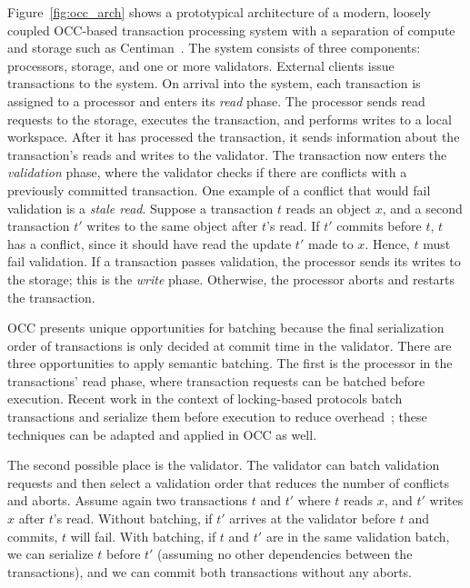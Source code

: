 Figure~\ref{fig:occ_arch} shows a prototypical architecture of a modern, loosely coupled OCC-based transaction processing system with a separation of compute and storage such as Centiman~\cite{ding2015centiman}. 
The system consists of three components: processors, storage, and one or more validators. External clients issue transactions to the system. On arrival into the system, each transaction is assigned to a processor and enters its \emph{read} phase. The processor sends read requests to the storage, executes the transaction, and performs writes to a local workspace. After it has processed the transaction, it sends information about the transaction's reads and writes to the validator. 
The transaction now enters the \emph{validation} phase, where 
the validator checks if there are conflicts with a previously committed transaction. 
One example of a conflict that would fail validation is a \emph{stale read}. Suppose a transaction $t$ reads an object $x$, and a second transaction
$t'$ writes to the same object after $t$'s read. If $t'$ commits before $t$, $t$
has a conflict, since it should have read the update $t'$ made to $x$. Hence, $t$ must fail validation. 
If a transaction passes validation, the processor sends its writes to the storage; this is the \emph{write} phase. Otherwise, the processor aborts and restarts the transaction.

OCC 
presents unique opportunities for batching because the final serialization order of transactions is only decided at commit time in the validator. 
There are three opportunities to apply semantic batching. The first is the processor in
the transactions' read phase, where transaction requests can be batched before
execution. Recent work in the context of locking-based protocols batch transactions 
and serialize them before execution to reduce overhead~\cite{faleiro2014rethinking,mu2014extracting,thomson2012calvin}; 
these techniques can be adapted and applied in OCC as well.

The second possible place is the validator. The validator can batch validation requests and then select 
a validation order that reduces the number of conflicts and
aborts. Assume again two transactions $t$ and $t'$ where $t$ reads $x$,
and $t'$ writes $x$ after $t$'s read. Without batching, if $t'$ arrives at
the validator before $t$ and commits, $t$ will fail. With
batching, if $t$ and $t'$ are in the same validation batch, 
we can serialize $t$ before $t'$ (assuming no other dependencies between the transactions), 
and we can commit both transactions without any aborts.

